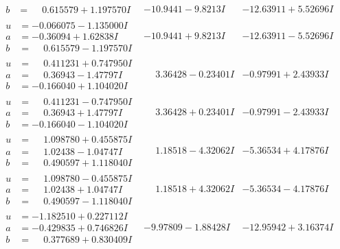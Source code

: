 \documentclass[1p]{elsarticle_modified}
\theoremstyle{definition}
\begin{document}
$$\begin{array}{c|c|c}
\begin{aligned}
b &= \phantom{-}0.615579 + 1.197570 I\end{aligned}
 & -10.9441 - 9.8213 I & -12.63911 + 5.52696 I \\ \hline\begin{aligned}
u &= -0.066075 - 1.135000 I \\
a &= -0.36094 + 1.62838 I \\
b &= \phantom{-}0.615579 - 1.197570 I\end{aligned}
 & -10.9441 + 9.8213 I & -12.63911 - 5.52696 I \\ \hline\begin{aligned}
u &= \phantom{-}0.411231 + 0.747950 I \\
a &= \phantom{-}0.36943 - 1.47797 I \\
b &= -0.166040 + 1.104020 I\end{aligned}
 & \phantom{-}3.36428 - 0.23401 I & -0.97991 + 2.43933 I \\ \hline\begin{aligned}
u &= \phantom{-}0.411231 - 0.747950 I \\
a &= \phantom{-}0.36943 + 1.47797 I \\
b &= -0.166040 - 1.104020 I\end{aligned}
 & \phantom{-}3.36428 + 0.23401 I & -0.97991 - 2.43933 I \\ \hline\begin{aligned}
u &= \phantom{-}1.098780 + 0.455875 I \\
a &= \phantom{-}1.02438 - 1.04747 I \\
b &= \phantom{-}0.490597 + 1.118040 I\end{aligned}
 & \phantom{-}1.18518 - 4.32062 I & -5.36534 + 4.17876 I \\ \hline\begin{aligned}
u &= \phantom{-}1.098780 - 0.455875 I \\
a &= \phantom{-}1.02438 + 1.04747 I \\
b &= \phantom{-}0.490597 - 1.118040 I\end{aligned}
 & \phantom{-}1.18518 + 4.32062 I & -5.36534 - 4.17876 I \\ \hline\begin{aligned}
u &= -1.182510 + 0.227112 I \\
a &= -0.429835 + 0.746826 I \\
b &= \phantom{-}0.377689 + 0.830409 I\end{aligned}
 & -9.97809 - 1.88428 I & -12.95942 + 3.16374 I \\ \hline\begin{aligned}

\end{aligned}
\end{array}$$
\end{document}
